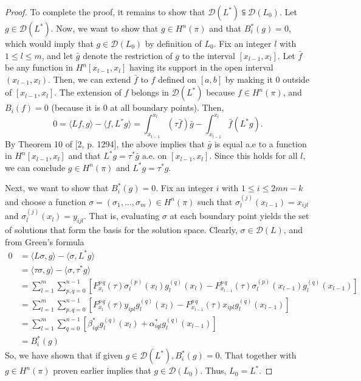 \documentclass[11pt,reqno,oneside,a4paper]{article}
\begin{document}
\begin{proof}
		To complete the proof, it remains to show that $\mathcal{D}(L^*) \subseteqq \mathcal{D}(L_0)$. Let $g \in \mathcal{D}(L^*)$. Now, we want to show that $g \in H^n(\pi)$ and that $B_i^*(g) = 0$, which would imply that $g \in \mathcal{D}(L_0)$ by definition of $L_0$. Fix an integer $l$ with $1 \leq l \leq m$, and let $\bar{g}$ denote the restriction of $g$ to the interval $[x_{l-1}, x_l].$ Let $\bar{f}$ be any function in $H^n[x_{l-1},x_l]$ having its support in the open interval $(x_{l-1},x_l)$. 
		Then, we can extend $\bar{f}$ to $f$ defined on $[a,b]$ by making it 0 outside of $[x_{l-1},x_l]$. The extension of $f$ belongs in $\mathcal{D}(L^*)$ because $f \in H^n(\pi)$, and $B_i(f) = 0$ (because it is 0 at all boundary points). Then,
		$$ 0 = \langle Lf,g\rangle - \langle f, L^*g\rangle = \int_{x_{l-1}}^{x_l}(\tau\bar{f})\bar{g} - \int_{x_{l-1}}^{x_l}\bar{f}(L^*g).$$
		By Theorem 10 of [2, p. 1294], the above implies that $\bar{g}$ is equal a.e to a function in $H^n[x_{l-1},x_l]$ and that $L^*g = \tau^*\bar{g}$ a.e. on $[x_{l-1},x_l]$. Since this holds for all $l$, we can conclude $g\in H^n(\pi)$ and $L^*g=\tau^*g$. 
		
		Next, we want to show that $B_i^*(g) = 0$. Fix an integer $i$ with $1\leq i \leq 2mn-k$ and choose a function $\sigma = (\sigma_1,\dots, \sigma_m) \in H^n(\pi)$ such that $\sigma_l^{(j)}(x_{l-1}) = x_{ijl}$ and $\sigma_l^{(j)}(x_{l}) = y_{ijl}$. That is, evaluating $\sigma$ at each boundary point yields the set of solutions that form the basis for the solution space. Clearly, $\sigma \in \mathcal{D}(L)$, and from Green's formula
		\begin{align*}
		     0 &= \langle L\sigma,g\rangle - \langle \sigma, L^*g\rangle\\
		     &= \langle \tau\sigma,g\rangle - \langle \sigma, \tau^*g\rangle\\
		     &= \sum_{l=1}^{m}\sum_{p,q=0}^{n-1}[F_{x_l}^{p\,q}(\tau)\sigma_l^{(p)}(x_l)g_l^{(q)}(x_l)
		     - F_{x_{l-1}}^{p\,q}(\tau)\sigma_l^{(p)}(x_{l-1})g_l^{(q)}(x_{l-1})]\\
		     &= \sum_{l=1}^{m}\sum_{p,q=0}^{n-1}[F_{x_l}^{p\,q}(\tau)y_{ipl}g_l^{(q)}(x_l)
		     - F_{x_{l-1}}^{p\,q}(\tau)x_{ipl}g_l^{(q)}(x_{l-1})]\\
		     &= \sum_{l=1}^{m}\sum_{q=0}^{n-1}[\beta_{iql}^*g_l^{(q)}(x_l) + \alpha_{iql}^*g_l^{(q)}(x_{l-1})]\\
		     &= B_i^*(g) 
		\end{align*}
		So, we have shown that if given $g \in \mathcal{D}(L^*), B_i^*(g) = 0$. That together with $g \in H^n(\pi)$ proven earlier implies that $g \in \mathcal{D}(L_0)$. Thus, $L_0 = L^*$.
	\end{proof}
\end{document}
